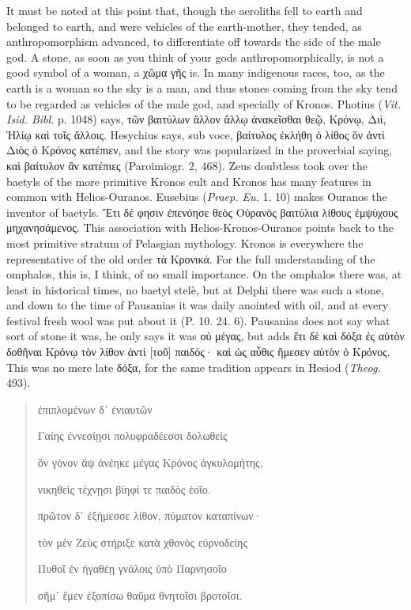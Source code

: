 \documentclass[a4paper, 11pt, oneside, polutonikogreek, english]{article}
\begin{document}
It must be noted at this point that, though the aeroliths fell to earth and belonged to earth, and were vehicles of the earth-mother, they tended, as anthropomorphism advanced, to differentiate off towards the side of the male god. A stone, as soon as you think of your gods anthropomorphically, is not a good symbol of a woman, a χῶμα γῆς is. In many indigenous races, too, as the earth is a woman so the sky is a man, and thus stones coming from the sky tend to be regarded as vehicles of the male god, and specially of Kronos. Photius (\emph{Vit. Isid. Bibl.} p. 1048) says, τῶν βαιτύλων ἄλλον ἄλλῳ ἀνακεῖσθαι θεῷ, Κρόνῳ, Διὶ, Ἡλίῳ καὶ τοῖς ἄλλοις. Hesychius says, sub voce, βαίτυλος ἐκλήθη ὁ λίθος ὃν ἀντὶ Διὸς ὁ Κρόνος κατέπιεν, and the story was popularized in the proverbial saying, καὶ βαίτυλον ἂν κατέπιες (Paroimiogr. 2, 468). Zeus doubtless took over the baetyls of the more primitive Kronos cult and Kronos has many features in common with Helios-Ouranos. Eusebius (\emph{Praep. Eu.} 1. 10) makes Ouranos the inventor of baetyls. Ἔτι δέ φησιν ἐπενόησε θεὸς Οὐρανὸς βαιτύλια λίθους ἐμψύχους μηχανησάμενος. This association with Helios-Kronos-Ouranos points back to the most primitive stratum of Pelasgian mythology. Kronos is everywhere the representative of the old order τὰ Κρονικά. For the full understanding of the omphalos, this is, I think, of no small importance. On the omphalos there was, at least in historical times, no baetyl stelè, but at Delphi there was such a stone, and down to the time of Pausanias it was daily anointed with oil, and at every festival fresh wool was put about it (P. 10. 24. 6). Pausanias does not say what sort of stone it was, he only says it was οὐ μέγας, but adds ἔτι δὲ καὶ δόξα ἐς αὐτὸν δοθῆναι Κρόνῳ τὸν λίθον ἀντὶ [τοῦ] παιδός· καὶ ὡς αὖθις ἥμεσεν αὐτὸν ὁ Κρόνος. This was no mere late δόξα, for the same tradition appears in Hesiod (\emph{Theog.} 493).
\begin{quotation}
\hspace*{15mm}ἐπιπλομένων δ᾽ ἐνιαυτῶν

Γαίης ἐννεσίῃσι πολυφραδέεσσι δολωθεὶς

ὃν γόνον ἂψ ἀνέηκε μέγας Κρόνος ἀγκυλομήτης,

νικηθεὶς τέχνῃσι βίηφί τε παιδὸς ἑοῖο.

πρῶτον δ᾽ ἐξήμεσσε λίθον, πύματον καταπίνων·

τὸν μὲν Ζεὺς στήριξε κατὰ χθονὸς εὐρνοδείης

Πυθοῖ ἐν ἠγαθέῃ γνάλοις ὑπὸ Παρνησοῖο

σῆμ᾽ ἔμεν ἐξοπίσω θαῦμα θνητοῖσι βροτοῖσι.
\end{quotation}
\end{document}

